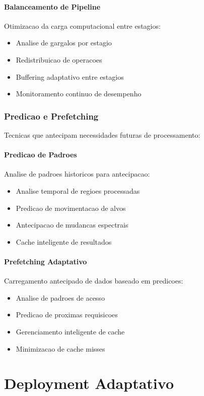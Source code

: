 \paragraph{Balanceamento de Pipeline}
Otimizacao da carga computacional entre estagios:
\begin{itemize}
    \item Analise de gargalos por estagio
    \item Redistribuicao de operacoes
    \item Buffering adaptativo entre estagios
    \item Monitoramento continuo de desempenho
\end{itemize}

\subsubsection{Predicao e Prefetching}
Tecnicas que antecipam necessidades futuras de processamento:

\paragraph{Predicao de Padroes}
Analise de padroes historicos para antecipacao:
\begin{itemize}
    \item Analise temporal de regioes processadas
    \item Predicao de movimentacao de alvos
    \item Antecipacao de mudancas espectrais
    \item Cache inteligente de resultados
\end{itemize}

\paragraph{Prefetching Adaptativo}
Carregamento antecipado de dados baseado em predicoes:
\begin{itemize}
    \item Analise de padroes de acesso
    \item Predicao de proximas requisicoes
    \item Gerenciamento inteligente de cache
    \item Minimizacao de cache misses
\end{itemize}

\section{Deployment Adaptativo}\label{sec:deployment_adaptativo}

